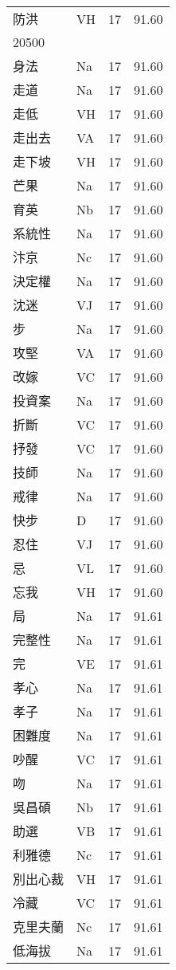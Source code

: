 \documentclass[twocolumn]{book}
\begin{document}
\begin{supertabular}{llrr}
防洪 & VH & 17 &  91.60\\
20500\\
身法 & Na & 17 &  91.60\\
走道 & Na & 17 &  91.60\\
走低 & VH & 17 &  91.60\\
走出去 & VA & 17 &  91.60\\
走下坡 & VH & 17 &  91.60\\
芒果 & Na & 17 &  91.60\\
育英 & Nb & 17 &  91.60\\
系統性 & Na & 17 &  91.60\\
汴京 & Nc & 17 &  91.60\\
決定權 & Na & 17 &  91.60\\
沈迷 & VJ & 17 &  91.60\\
步 & Na & 17 &  91.60\\
攻堅 & VA & 17 &  91.60\\
改嫁 & VC & 17 &  91.60\\
投資案 & Na & 17 &  91.60\\
折斷 & VC & 17 &  91.60\\
抒發 & VC & 17 &  91.60\\
技師 & Na & 17 &  91.60\\
戒律 & Na & 17 &  91.60\\
快步 & D & 17 &  91.60\\
忍住 & VJ & 17 &  91.60\\
忌 & VL & 17 &  91.60\\
忘我 & VH & 17 &  91.60\\
局 & Na & 17 &  91.61\\
完整性 & Na & 17 &  91.61\\
完 & VE & 17 &  91.61\\
孝心 & Na & 17 &  91.61\\
孝子 & Na & 17 &  91.61\\
困難度 & Na & 17 &  91.61\\
吵醒 & VC & 17 &  91.61\\
吻 & Na & 17 &  91.61\\
吳昌碩 & Nb & 17 &  91.61\\
助選 & VB & 17 &  91.61\\
利雅德 & Nc & 17 &  91.61\\
別出心裁 & VH & 17 &  91.61\\
冷藏 & VC & 17 &  91.61\\
克里夫蘭 & Nc & 17 &  91.61\\
低海拔 & Na & 17 &  91.61\\

\end{supertabular}
\end{document}
